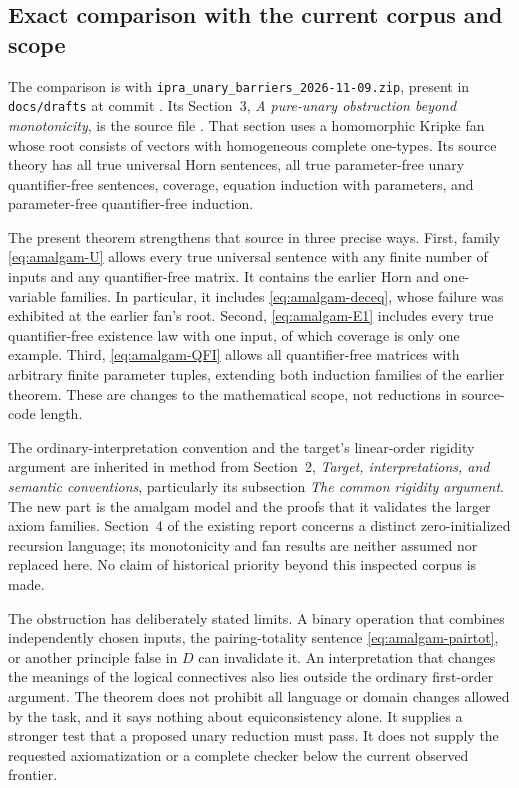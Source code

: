 \subsection{Exact comparison with the current corpus and scope}
\label{subsec:amalgam-comparison}

The comparison is with
\texttt{ipra\_unary\_barriers\_2026-11-09.zip}, present in
\texttt{docs/drafts} at commit
.
Its Section~3, \emph{A pure-unary obstruction beyond monotonicity},
is the source file . That section
uses a homomorphic Kripke fan whose root consists of vectors with
homogeneous complete one-types. Its source theory has all true
universal Horn sentences, all true parameter-free unary
quantifier-free sentences, coverage, equation induction with
parameters, and parameter-free quantifier-free induction.

The present theorem strengthens that source in three precise ways.
First, family \eqref{eq:amalgam-U} allows every true universal
sentence with any finite number of inputs and any quantifier-free
matrix. It contains the earlier Horn and one-variable families.
In particular, it includes \eqref{eq:amalgam-deceq}, whose failure
was exhibited at the earlier fan's root. Second,
\eqref{eq:amalgam-E1} includes every true quantifier-free existence
law with one input, of which coverage is only one example.
Third, \eqref{eq:amalgam-QFI} allows all quantifier-free matrices
with arbitrary finite parameter tuples, extending both induction
families of the earlier theorem. These are changes to the
mathematical scope, not reductions in source-code length.

The ordinary-interpretation convention and the target's linear-order
rigidity argument are inherited in method from Section~2, \emph{Target,
interpretations, and semantic conventions}, particularly its
subsection \emph{The common rigidity argument}. The new part is the
amalgam model and the proofs that it validates the larger axiom
families. Section~4 of the existing report concerns a distinct
zero-initialized recursion language; its monotonicity and fan results
are neither assumed nor replaced here. No claim of historical
priority beyond this inspected corpus is made.

The obstruction has deliberately stated limits. A binary operation
that combines independently chosen inputs, the pairing-totality
sentence \eqref{eq:amalgam-pairtot}, or another principle false in
$D$ can invalidate it. An interpretation that changes the meanings
of the logical connectives also lies outside the ordinary
first-order argument. The theorem does not prohibit all language or
domain changes allowed by the task, and it says nothing about
equiconsistency alone. It supplies a stronger test that a proposed
unary reduction must pass. It does not supply the requested
axiomatization or a complete checker below the current observed
frontier.

